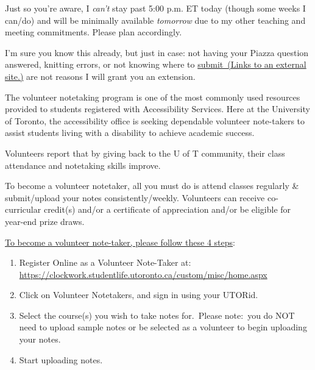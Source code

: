 \documentclass[
  openany]{book}
\begin{document}
\begin{longtable}[]
Just so you're aware, I \emph{can't} stay past 5:00 p.m. ET today (though some weeks I can/do) and will be minimally available \emph{tomorrow} due to my other teaching and meeting commitments. Please plan accordingly.


I'm sure you know this already, but just in case: not having your Piazza question answered, knitting errors, or not knowing where to \href{https://markus-ds.teach.cs.toronto.edu/courses}{submit~(Links to an external site.)} are not reasons I will grant you an extension.~ \\
\bottomrule
\end{longtable}

The volunteer notetaking program is one of the most commonly used resources provided to students registered with Accessibility Services. Here at the University of Toronto, the accessibility office is seeking dependable volunteer note-takers to assist students living with a disability to achieve academic success.

Volunteers report that by giving back to the U of T community, their class attendance and notetaking skills improve.

To become a volunteer notetaker, all you must do is attend classes regularly \& submit/upload your notes consistently/weekly. Volunteers can receive co-curricular credit(s) and/or a certificate of appreciation and/or be eligible for year-end prize draws.

\underline{To become a volunteer note-taker, please follow these 4 steps}:

\begin{enumerate}
\def\labelenumi{\arabic{enumi}.}
\item
  Register Online as a Volunteer Note-Taker at: \url{https://clockwork.studentlife.utoronto.ca/custom/misc/home.aspx}
\item
  Click on Volunteer Notetakers, and sign in using your UTORid.
\item
  Select the course(s) you wish to take notes for.~Please note:~you do NOT need to upload sample notes or be selected as a volunteer to begin uploading your notes.
\item
  Start uploading notes.
\end{enumerate}
\end{document}
